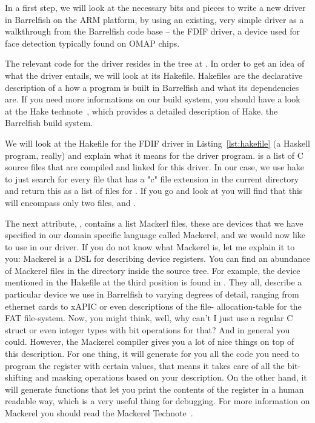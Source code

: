 \documentclass[a4paper,11pt,twoside]{report}
\begin{document}
In a first step, we will look at the necessary bits and pieces to write a new
driver in Barrelfish on the ARM platform, by using an existing, very simple
driver as a walkthrough from the Barrelfish code base -- the FDIF driver, a
device used for face detection typically found on OMAP chips.

The relevant code for the driver resides in the tree at
. In order to get an idea of what the
driver entails, we will look at its Hakefile. Hakefiles are the declarative
description of a how a program is built in Barrelfish and what its
dependencies are. If you need more informations on our build system, you
should have a look at the Hake technote~\cite{btn003-hake}, which provides a
detailed description of Hake, the Barrelfish build system.

We will look at the Hakefile for the FDIF driver in Listing~\ref{lst:hakefile}
(a Haskell program, really) and explain what it means for the driver program.
 is a list of C source files that are compiled and linked for
this driver. In our case, we use hake to just search for every file that has a
"c" file extension in the current directory and return this as a list of files
for . If you go and look at
 you will find that this will encompass
only two files,  and .

The next attribute, , contains a list Mackerl files,
these are devices that we have specified in our domain specific language
called Mackerel, and we would now like to use in our driver. If you do not
know what Mackerel is, let me explain it to you: Mackerel is a DSL for
describing device registers. You can find an abundance of Mackerel files in
the  directory inside the source tree. For example, the
 device mentioned in the Hakefile at the third
position is found in . They all,
describe a particular device we use in Barrelfish to varying degrees of
detail, ranging from ethernet cards to xAPIC or even descriptions of the file-
allocation-table for the FAT file-system. Now, you might think, well, why
can't I just use a regular C struct or even integer types with bit operations
for that? And in general you could. However, the Mackerel compiler gives you a
lot of nice things on top of this description. For one thing, it will generate
for you all the code you need to program the register with certain values,
that means it takes care of all the bit-shifting and masking operations based
on your description. On the other hand, it will generate functions that let
you print the contents of the register in a human readable way, which is a
very useful thing for debugging. For more information on Mackerel you should
read the Mackerel Technote~\cite{btn002-mackerel}.
\end{document}
